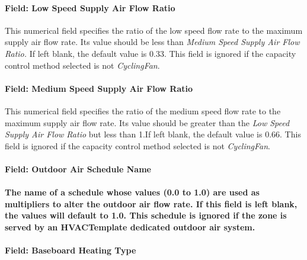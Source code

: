 \paragraph{Field: Low Speed Supply Air Flow Ratio}\label{field-low-speed-supply-air-flow-ratio}

This numerical field specifies the ratio of the low speed flow rate to the maximum supply air flow rate. Its value should be less than \emph{Medium Speed Supply Air Flow Ratio.} If left blank, the default value is 0.33. This field is ignored if the capacity control method selected is not \emph{CyclingFan}.

\paragraph{Field: Medium Speed Supply Air Flow Ratio}\label{field-medium-speed-supply-air-flow-ratio}

This numerical field specifies the ratio of the medium speed flow rate to the maximum supply air flow rate. Its value should be greater than the \emph{Low Speed Supply Air Flow Ratio} but less than 1.If left blank, the default value is 0.66. This field is ignored if the capacity control method selected is not \emph{CyclingFan}.

\paragraph{Field: Outdoor Air Schedule Name}\label{field-outdoor-air-schedule-name}

\paragraph{The name of a schedule whose values (0.0 to 1.0) are used as multipliers to alter the outdoor air flow rate. If this field is left blank, the values will default to 1.0. This schedule is ignored if the zone is served by an HVACTemplate dedicated outdoor air system.}\label{the-name-of-a-schedule-whose-values-0.0-to-1.0-are-used-as-multipliers-to-alter-the-outdoor-air-flow-rate.-if-this-field-is-left-blank-the-values-will-default-to-1.0.-this-schedule-is-ignored-if-the-zone-is-served-by-an-hvactemplate-dedicated-outdoor-air-system.}

\paragraph{Field: Baseboard Heating Type}\label{field-baseboard-heating-type-1}

